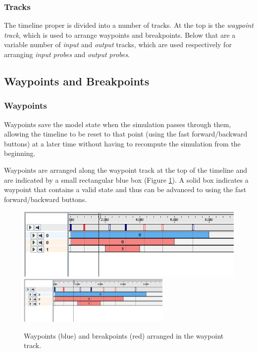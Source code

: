 \documentclass{article}
\begin{document}

\subsubsection{Tracks}

The timeline proper is divided into a number of tracks. At the top is
the {\it waypoint track}, which is used to arrange waypoints and 
breakpoints. Below that are a variable number of {\it input} and
{\it output} tracks, which are used respectively for arranging {\it input
probes} and {\it output probes}.


\subsection{Waypoints and Breakpoints}
\label{waypointsSec}

\subsubsection{Waypoints}

Waypoints save the model state when the simulation passes through
them, allowing the timeline to be reset to that point (using the
fast forward/backward buttons) at a later time without having to
recompute the simulation from the beginning.

Waypoints are arranged along the waypoint track at the top of the
timeline and are indicated by a small rectangular blue box
(Figure \ref{waypointsFig}). A solid box indicates a waypoint that contains a
valid state and thus can be advanced to using the fast forward/backward
buttons.

\begin{figure}
\begin{center}
\iflatexml
\includegraphics[]{images/waypoints}
\else
\includegraphics[width=0.66\textwidth]{images/waypoints}
\fi
\end{center}
\caption{Waypoints (blue) and breakpoints (red) arranged in the waypoint track.}%
\label{waypointsFig}
\end{figure}
\end{document}
